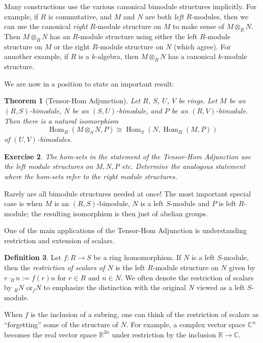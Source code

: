 \documentclass[12pt]{article}
\theoremstyle{plain}
\newtheorem{theorem}{Theorem}[section]
\newtheorem{exercise}[theorem]{Exercise}
\theoremstyle{definition}
\newtheorem{definition}[theorem]{Definition}
\theoremstyle{remark}
\numberwithin{equation}{section}
\begin{document}
Many constructions use the various canonical bimodule structures
implicitly.
For example, if $R$ is commutative, and $M$ and $N$ are both
\emph{left} $R$-modules, then we can use the canonical
\emph{right} $R$-module structure on $M$
to make sense of $M \otimes_R N$.
Then $M \otimes_R N$ has an $R$-module structure using either the left
$R$-module structure on $M$ or the right $R$-module structure on $N$
(which agree).
For annother example, if $R$ is a $k$-algebra, then $M \otimes_R N$
has a canonical $k$-module structure.

We are now in a position to state an important result:

\begin{theorem}[Tensor-Hom Adjunction]
Let $R$, $S$, $U$, $V$ be rings.
Let $M$ be an $(R,S)$-bimodule, $N$ be an $(S,U)$-bimodule,
and $P$ be an $(R,V)$-bimodule.
Then there is a natural isomorphism
\[
\operatorname{Hom}_R(M \otimes_S N,P)
\cong \operatorname{Hom}_S(N,\operatorname{Hom}_R(M,P))
\]
 of $(U,V)$-bimodules.
\end{theorem}

\begin{exercise}
The hom-sets in the statement of the Tensor-Hom Adjunction
use the \emph{left} module structures on $M,N,P$ etc.
Determine the analogous statement where the hom-sets
refer to the \emph{right} module structures.
\end{exercise}

Rarely are all bimodule structures needed at once!
The most important special case is when $M$ is an $(R,S)$-bimodule,
$N$ is a left $S$-module and $P$ is left $R$-module;
the resulting isomorphism is then just of abelian groups.

One of the main applications of the Tensor-Hom Adjunction is
understanding restriction and extension of scalars.

\begin{definition}
Let $f : R \to S$ be a ring homomorphism.
If $N$ is a left $S$-module, then the \emph{restriction of scalars
of $N$} is the left $R$-module structure on $N$ given by
$r \cdot_R n := f(r)n$ for $r \in R$ and $n \in N$.
We often denote the restriction of scalars by ${}_RN$
or${}_fN$ to emphasize the distinction with the original $N$
viewed as a left $S$-module.
\end{definition} 

When $f$ is the inclusion of a subring, one can think of the restriction
of scalars as ``forgetting'' some of the structure of $N$.
For example, a complex vector space $\mathbb{C}^n$ becomes the real
vector space $\mathbb{R}^{2n}$ under restriction by the inclusion
$\mathbb{R} \to \mathbb{C}$.
\end{document}

